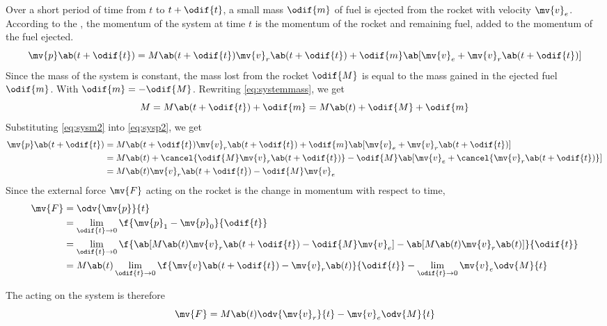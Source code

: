 Over a short period of time from \(t\) to \(t + \odif{t}\),
a small mass \(\odif{m}\) of fuel is ejected from the rocket with
velocity \(\mv{v}_e\). According to the ,
the momentum of the system at time \(t\) is the momentum of the
rocket and remaining fuel,
added to the momentum of the fuel ejected.
\begin{equation}
	\mv{p}\ab(t + \odif{t}) = M\ab(t+\odif{t})\mv{v}_r\ab(t+\odif{t}) +
	\odif{m}\ab[\mv{v}_e + \mv{v}_r\ab(t+\odif{t})]
	\label{eq:sysp2}
\end{equation}
Since the mass of the system is constant, the mass lost from the
rocket \(\odif{M}\)
is equal to the mass gained in the ejected fuel \(\odif{m}\). With
\(\odif{m} = -\odif{M}\). Rewriting \cref{eq:systemmass}, we get
\begin{equation}
	M = M\ab(t+\odif{t}) + \odif{m} = M\ab(t) + \odif{M} + \odif{m}
	\label{eq:sysm2}
\end{equation}
Substituting \cref{eq:sysm2} into \cref{eq:sysp2}, we get
\begin{align*}
	\mv{p}\ab(t + \odif{t}) & = M\ab(t+\odif{t})\mv{v}_r\ab(t+\odif{t}) +
	\odif{m}\ab[\mv{v}_e + \mv{v}_r\ab(t+\odif{t})]                                                         \\
	                        & = M\ab(t) + \cancel{\odif{M}\mv{v}_r\ab(t+\odif{t})} - \odif{M}\ab[\mv{v}_e +
	\cancel{\mv{v}_r\ab(t+\odif{t})}]                                                                       \\
	                        & = M\ab(t)\mv{v}_r\ab(t+\odif{t}) - \odif{M}\mv{v}_e
\end{align*}
Since the external force \(\mv{F}\) acting on the rocket is the
change in momentum
with respect to time,
\begin{align*}
	\mv{F} & = \odv{\mv{p}}{t}                                              \\
	       & = \lim_{\odif{t}\to 0} \f{\mv{p}_1 - \mv{p}_0}{\odif{t}}       \\
	       & = \lim_{\odif{t}\to 0} \f{\ab[M\ab(t)\mv{v}_r\ab(t+\odif{t}) -
			\odif{M}\mv{v}_e] -
	\ab[M\ab(t)\mv{v}_r\ab(t)]}{\odif{t}}                                   \\
	       & = M\ab(t)\lim_{\odif{t}\to
		0}\f{\mv{v}\ab(t+\odif{t})-\mv{v}_r\ab(t)}{\odif{t}}-\lim_{\odif{t}\to
		0}\mv{v}_e\odv{M}{t}
\end{align*}

The  acting on the system is therefore
\begin{equation}
	\mv{F} = M\ab(t)\odv{\mv{v}_r}{t} - \mv{v}_e\odv{M}{t}
	\label{eq:fext}
\end{equation}

